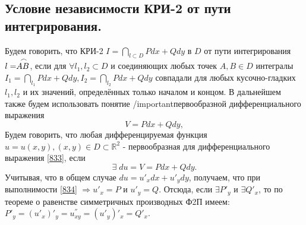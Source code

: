 \subsection{Условие независимости КРИ-2 от пути интегрирования.}
Будем говорить, что КРИ-2 $I = \dint\limits_{l \subset D} Pdx + Qdy$  в $D$ от пути интегрирования $l = \arc{AB}$, если для $\forall l_1, l_2 \subset D$ и соединяющих любых точек $A, B \in D$ интегралы $I_1 = \dint\limits_{l_1} Pdx + Qdy, I_2 = \dint\limits_{l_2} Pdx + Qdy$ совпадали для любых кусочно-гладких $l_1, l_2$ и их значений, определённых только началом и концом. В дальнейшем также будем использовать понятие /important{первообразной дифференциального выражения}
\begin{equation}
\label{833}
V = Pdx + Qdy,
\end{equation}
Будем говорить, что любая дифференцируемая функция $u = u(x,y), (x,y) \in D \subset \mathbb{R}^2$ - первообразная для дифференциального выражения \eqref{833}, если 
\begin{equation}
\label{834}
\exists \; du = V = Pdx + Qdy.
\end{equation}
Учитывая, что в общем случае $du = u'_x dx + u'_y dy$, получаем, что при выполнимости \eqref{834} $\Rightarrow u'_x = P$ и $u'_y = Q$. Отсюда, если $\exists P'_y$ и $\exists Q'_x$, то по теореме о равенстве симметричных производных Ф2П имеем: $P'_y  = (u'_x)'_y = u_{xy}^{''} = (u'_y)'_x = Q'_x$.

